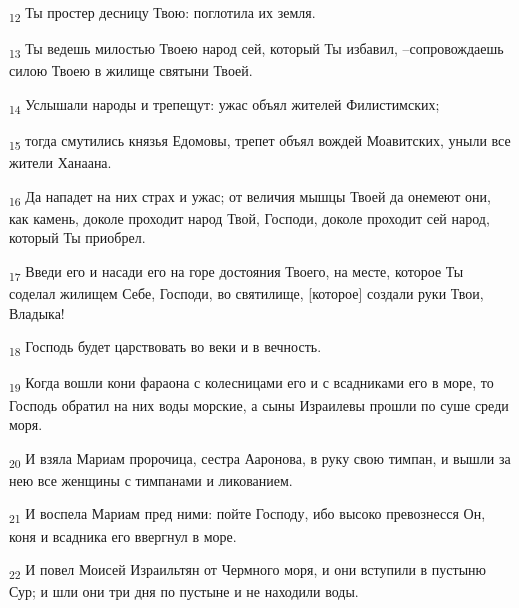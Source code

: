 \begin{tcolorbox}
\textsubscript{12} Ты простер десницу Твою: поглотила их земля.
\end{tcolorbox}
\begin{tcolorbox}
\textsubscript{13} Ты ведешь милостью Твоею народ сей, который Ты избавил, --сопровождаешь силою Твоею в жилище святыни Твоей.
\end{tcolorbox}
\begin{tcolorbox}
\textsubscript{14} Услышали народы и трепещут: ужас объял жителей Филистимских;
\end{tcolorbox}
\begin{tcolorbox}
\textsubscript{15} тогда смутились князья Едомовы, трепет объял вождей Моавитских, уныли все жители Ханаана.
\end{tcolorbox}
\begin{tcolorbox}
\textsubscript{16} Да нападет на них страх и ужас; от величия мышцы Твоей да онемеют они, как камень, доколе проходит народ Твой, Господи, доколе проходит сей народ, который Ты приобрел.
\end{tcolorbox}
\begin{tcolorbox}
\textsubscript{17} Введи его и насади его на горе достояния Твоего, на месте, которое Ты соделал жилищем Себе, Господи, во святилище, [которое] создали руки Твои, Владыка!
\end{tcolorbox}
\begin{tcolorbox}
\textsubscript{18} Господь будет царствовать во веки и в вечность.
\end{tcolorbox}
\begin{tcolorbox}
\textsubscript{19} Когда вошли кони фараона с колесницами его и с всадниками его в море, то Господь обратил на них воды морские, а сыны Израилевы прошли по суше среди моря.
\end{tcolorbox}
\begin{tcolorbox}
\textsubscript{20} И взяла Мариам пророчица, сестра Ааронова, в руку свою тимпан, и вышли за нею все женщины с тимпанами и ликованием.
\end{tcolorbox}
\begin{tcolorbox}
\textsubscript{21} И воспела Мариам пред ними: пойте Господу, ибо высоко превознесся Он, коня и всадника его ввергнул в море.
\end{tcolorbox}
\begin{tcolorbox}
\textsubscript{22} И повел Моисей Израильтян от Чермного моря, и они вступили в пустыню Сур; и шли они три дня по пустыне и не находили воды.
\end{tcolorbox}
